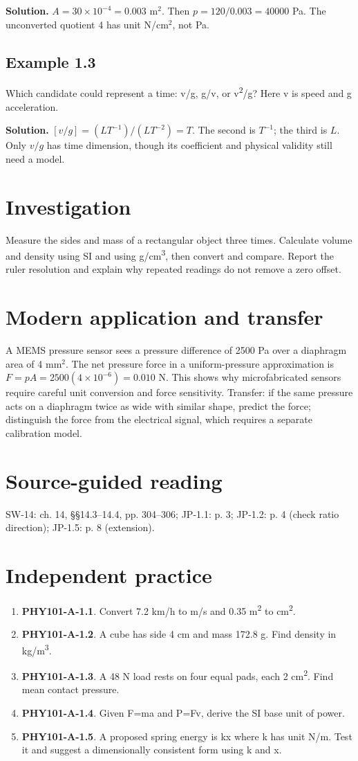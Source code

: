 \documentclass[11pt,a4paper,openany]{book}
\begin{document}
\textbf{Solution.} $A=30\times10^{-4}=0.003$ m$^2$. Then $p=120/0.003=40000$ Pa. The unconverted quotient 4 has unit N/cm$^2$, not Pa.
\subsection*{Example 1.3}
Which candidate could represent a time: v/g, g/v, or v\textsuperscript{2}/g? Here v is speed and g acceleration.

\textbf{Solution.} $[v/g]=(LT^{-1})/(LT^{-2})=T$. The second is $T^{-1}$; the third is $L$. Only $v/g$ has time dimension, though its coefficient and physical validity still need a model.
\section{Investigation}
Measure the sides and mass of a rectangular object three times. Calculate volume and density using SI and using g/cm\textsuperscript{3}, then convert and compare. Report the ruler resolution and explain why repeated readings do not remove a zero offset.
\section{Modern application and transfer}
A MEMS pressure sensor sees a pressure difference of 2500 Pa over a diaphragm area of 4 mm$^2$. The net pressure force in a uniform-pressure approximation is $F=pA=2500(4\times10^{-6})=0.010$ N. This shows why microfabricated sensors require careful unit conversion and force sensitivity. Transfer: if the same pressure acts on a diaphragm twice as wide with similar shape, predict the force; distinguish the force from the electrical signal, which requires a separate calibration model.
\section{Source-guided reading}
SW-14: ch. 14, §§14.3–14.4, pp. 304–306; JP-1.1: p. 3; JP-1.2: p. 4 (check ratio direction); JP-1.5: p. 8 (extension).
\section{Independent practice}
\begin{enumerate}
\item \textbf{PHY101-A-1.1}. Convert 7.2 km/h to m/s and 0.35 m\textsuperscript{2} to cm\textsuperscript{2}.
\item \textbf{PHY101-A-1.2}. A cube has side 4 cm and mass 172.8 g. Find density in kg/m\textsuperscript{3}.
\item \textbf{PHY101-A-1.3}. A 48 N load rests on four equal pads, each 2 cm\textsuperscript{2}. Find mean contact pressure.
\item \textbf{PHY101-A-1.4}. Given F=ma and P=Fv, derive the SI base unit of power.
\item \textbf{PHY101-A-1.5}. A proposed spring energy is kx where k has unit N/m. Test it and suggest a dimensionally consistent form using k and x.
\end{enumerate}
\end{document}

